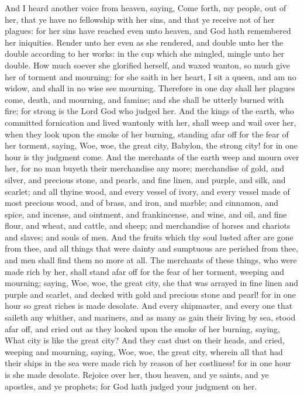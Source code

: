  And I heard another voice from heaven, saying, Come forth, my people, out of her, that ye have no fellowship with her sins, and that ye receive not of her plagues: 
 for her sins have reached even unto heaven, and God hath remembered her iniquities. 
 Render unto her even as she rendered, and double unto her the double according to her works: in the cup which she mingled, mingle unto her double. 
 How much soever she glorified herself, and waxed wanton, so much give her of torment and mourning: for she saith in her heart, I sit a queen, and am no widow, and shall in no wise see mourning. 
 Therefore in one day shall her plagues come, death, and mourning, and famine; and she shall be utterly burned with fire; for strong is the Lord God who judged her. 
 And the kings of the earth, who committed fornication and lived wantonly with her, shall weep and wail over her, when they look upon the smoke of her burning, 
 standing afar off for the fear of her torment, saying, Woe, woe, the great city, Babylon, the strong city! for in one hour is thy judgment come. 
 And the merchants of the earth weep and mourn over her, for no man buyeth their merchandise any more; 
 merchandise of gold, and silver, and precious stone, and pearls, and fine linen, and purple, and silk, and scarlet; and all thyine wood, and every vessel of ivory, and every vessel made of most precious wood, and of brass, and iron, and marble; 
 and cinnamon, and spice, and incense, and ointment, and frankincense, and wine, and oil, and fine flour, and wheat, and cattle, and sheep; and merchandise of horses and chariots and slaves; and souls of men. 
 And the fruits which thy soul lusted after are gone from thee, and all things that were dainty and sumptuous are perished from thee, and men shall find them no more at all. 
 The merchants of these things, who were made rich by her, shall stand afar off for the fear of her torment, weeping and mourning; 
 saying, Woe, woe, the great city, she that was arrayed in fine linen and purple and scarlet, and decked with gold and precious stone and pearl! 
 for in one hour so great riches is made desolate. And every shipmaster, and every one that saileth any whither, and mariners, and as many as gain their living by sea, stood afar off, 
 and cried out as they looked upon the smoke of her burning, saying, What city is like the great city? 
 And they cast dust on their heads, and cried, weeping and mourning, saying, Woe, woe, the great city, wherein all that had their ships in the sea were made rich by reason of her costliness! for in one hour is she made desolate. 
 Rejoice over her, thou heaven, and ye saints, and ye apostles, and ye prophets; for God hath judged your judgment on her.

